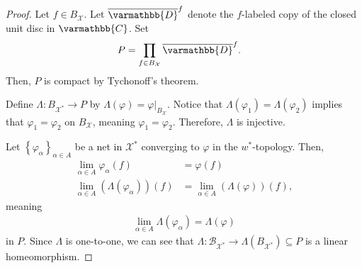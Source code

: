 \documentclass[10pt]{extarticle}
\newcommand{\C}{\mathbb{C}}
\newcommand{\set}[1]{\left\{#1\right\}}
\theoremstyle{plain}
\theoremstyle{definition}
\theoremstyle{note}
\renewcommand*{\mathbb}[1]{\varmathbb{#1}}
\renewcommand{\newline}{\hfill\break}
\begin{document}
\begin{proof}
  Let $f\in B_{\mathcal{X}}$. Let $\overline{\mathbb{D}}^{f}$ denote the $f$-labeled copy of the closed unit disc in $\C$. Set
  \begin{align*}
    P &= \prod_{f\in B_{\mathcal{X}}}\overline{\mathbb{D}}^{f}.
  \end{align*}
  Then, $P$ is compact by Tychonoff's theorem.\newline

  Define $\Lambda: B_{\mathcal{X}^{\ast}} \rightarrow P$ by $\Lambda(\varphi) = \varphi\vert_{B_{\mathcal{X}}}$. Notice that $\Lambda(\varphi_1) = \Lambda(\varphi_2)$ implies that $\varphi_1 = \varphi_2$ on $B_{\mathcal{X}}$, meaning $\varphi_1 = \varphi_2$. Therefore, $\Lambda$ is injective.\newline

  Let $\set{\varphi_{\alpha}}_{\alpha \in A}$ be a net in $\mathcal{X}^{\ast}$ converging to $\varphi$ in the $w^{\ast}$-topology. Then,
  \begin{align*}
    \lim_{\alpha \in A}\varphi_{\alpha}(f) &= \varphi(f)\\
    \lim_{\alpha \in A}\left(\Lambda\left(\varphi_{\alpha}\right)\right)(f) &= \lim_{\alpha \in A}\left(\Lambda\left(\varphi\right)\right)(f),
  \end{align*}
  meaning
  \begin{align*}
    \lim_{\alpha \in A}\Lambda\left(\varphi_{\alpha}\right) = \Lambda\left(\varphi\right)
  \end{align*}
  in $P$. Since $\Lambda$ is one-to-one, we can see that $\Lambda: \mathcal{B}_{\mathcal{X}^{\ast}} \rightarrow \Lambda\left(B_{\mathcal{X}^{\ast}}\right)\subseteq P$ is a linear homeomorphism.\newline


\end{proof}
\end{document}
